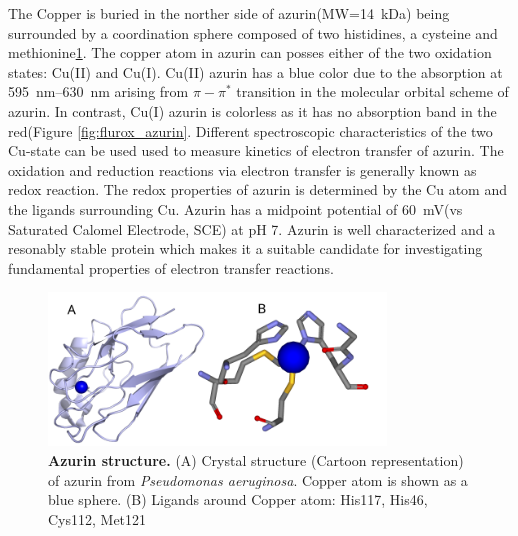 The Copper is buried in the norther side of azurin(MW=\SI{14}{\kilo\dalton}) being surrounded by a coordination sphere composed of two histidines, a cysteine and methionine\ref{fig:azurin_structure}.
The copper atom in azurin can posses either of the two oxidation states: Cu(II) and Cu(I).
Cu(II) azurin has a blue color due to the absorption at \SIrange{595}{630}{\nm} arising from $\pi - \pi^*$ transition in the molecular orbital scheme of azurin.\cite{dooley1981spectroscopic,schmauder2005sensitive}
In contrast, Cu(I) azurin is colorless as it has no absorption band in the red(Figure \ref{fig:flurox_azurin}.
Different spectroscopic characteristics of the two Cu-state can be used used to measure kinetics of electron transfer of azurin.
The oxidation and reduction reactions via electron transfer is generally known as redox reaction.
The redox properties of azurin is determined by the Cu atom and the ligands surrounding Cu.
Azurin has a midpoint potential of \SI{60}{\mV}(vs Saturated Calomel Electrode, SCE) at pH 7.
Azurin is well characterized and a resonably stable protein which makes it a suitable candidate for investigating fundamental properties of electron transfer reactions.
\begin{figure}
	\centering
	\includegraphics[width=0.8\textwidth]{azurin_structure}
	\caption{\textbf{Azurin structure.} (A) Crystal structure (Cartoon representation) of azurin from \textit{Pseudomonas aeruginosa}.\cite{adman1981structural}
	Copper atom is shown as a blue sphere.
	(B) Ligands around Copper atom: His117, His46, Cys112, Met121}
	\label{fig:azurin_structure}
\end{figure}

